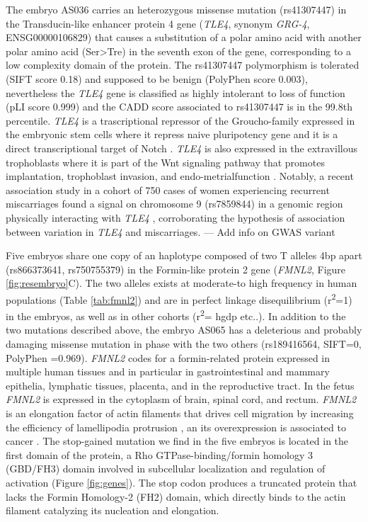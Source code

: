 \documentclass[fleqn,10pt]{wlscirep}
\begin{document}
The embryo AS036 carries an heterozygous missense mutation (rs41307447) in the Transducin-like enhancer protein 4 gene (\textit{TLE4}, synonym \textit{GRG-4}, ENSG00000106829) that causes a substitution of a polar amino acid with another polar amino acid (Ser>Tre) in the seventh exon of the gene, corresponding to a low complexity domain of the protein. The rs41307447 polymorphism is tolerated (SIFT score 0.18) and supposed to be benign (PolyPhen score 0.003), nevertheless the \textit{TLE4} gene is classified as highly intolerant to loss of function (pLI score 0.999) and the CADD score associated to rs41307447 is in the 99.8th percentile. 
\textit{TLE4} is a trascriptional repressor of the Groucho-family expressed in the embryonic stem cells where it repress naive pluripotency gene \cite{laing2015gro} and it is a direct transcriptional target of Notch \cite{menchero2019transitions}. \textit{TLE4} is also expressed in the extravillous trophoblasts \cite{meinhardt2014wnt} where it is part of the Wnt signaling pathway that promotes implantation, trophoblast invasion, and endo-metrialfunction \cite{sonderegger2010wnt}. Notably, a recent association study in a cohort of 750 cases of women experiencing recurrent miscarriages found a signal on chromosome 9 (rs7859844) in a genomic region physically interacting with \textit{TLE4} \cite{laisk2019genetic}, corroborating the hypothesis of association between variation in \textit{TLE4} and miscarriages. --- Add info on GWAS variant 

Five embryos share one copy of an haplotype composed of two T alleles 4bp apart (rs866373641, rs750755379) in the Formin-like protein 2 gene (\textit{FMNL2}, Figure \ref{fig:resembryo}C). The two alleles exists at moderate-to high frequency in human populations (Table \ref{tab:fmnl2}) and are in perfect linkage disequilibrium (r\textsuperscript{2}=1) in the embryos, as well as in other cohorts (r\textsuperscript{2}= hgdp etc..). In addition to the two mutations described above, the embryo AS065 has a deleterious and probably damaging missense mutation in phase with the two others (rs189416564, SIFT=0, PolyPhen =0.969). \textit{FMNL2} codes for a formin-related protein expressed in multiple human tissues and in particular in gastrointestinal and mammary epithelia, lymphatic tissues, placenta, and in the reproductive tract\cite{gardberg2010characterization}. In the fetus \textit{FMNL2} is expressed in the cytoplasm of brain, spinal cord, and rectum\cite{lizio2015gateways}. \textit{FMNL2} is an elongation factor of actin filaments that drives cell migration by increasing the efficiency of lamellipodia protrusion \cite{block2012fmnl2, kuhn2015structure}, an its overexpression is associated to cancer \cite{zhu2011fmnl2}. The stop-gained mutation we find in the five embryos is located in the first domain of the protein, a Rho GTPase-binding/formin homology 3 (GBD/FH3) domain involved in subcellular localization and regulation of activation (Figure \ref{fig:genes}). The stop codon produces a truncated protein that lacks the Formin Homology-2 (FH2) domain, which directly binds to the actin filament catalyzing its nucleation and elongation.
\end{document}
